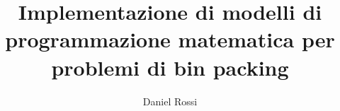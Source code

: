 \title{Implementazione di modelli di programmazione matematica per problemi di bin packing 
}
\author{Daniel Rossi}



